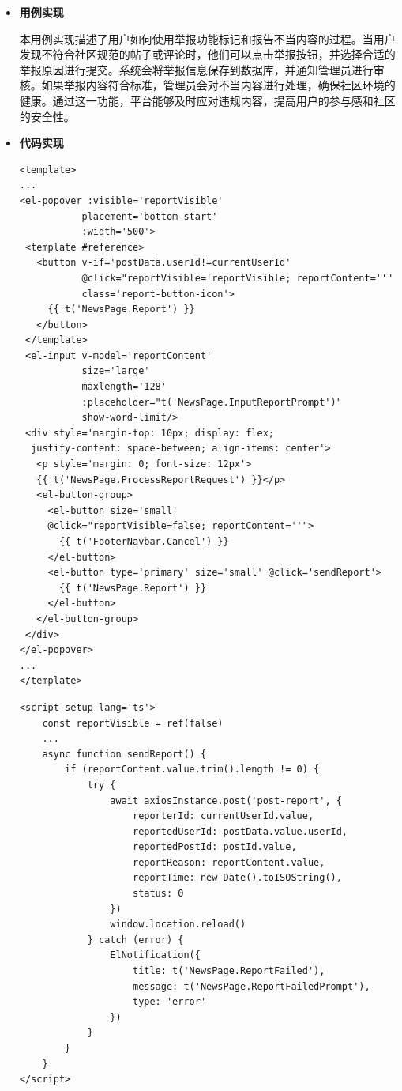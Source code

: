 \begin{itemize}
	\item \textbf{用例实现}
	
	本用例实现描述了用户如何使用举报功能标记和报告不当内容的过程。当用户发现不符合社区规范的帖子或评论时，他们可以点击举报按钮，并选择合适的举报原因进行提交。系统会将举报信息保存到数据库，并通知管理员进行审核。如果举报内容符合标准，管理员会对不当内容进行处理，确保社区环境的健康。通过这一功能，平台能够及时应对违规内容，提高用户的参与感和社区的安全性。
	
	\item \textbf{代码实现}
	\begin{verbatim}
<template>
...
<el-popover :visible='reportVisible'
           placement='bottom-start'
           :width='500'>
 <template #reference>
   <button v-if='postData.userId!=currentUserId'
           @click="reportVisible=!reportVisible; reportContent=''"
           class='report-button-icon'>
     {{ t('NewsPage.Report') }}
   </button>
 </template>
 <el-input v-model='reportContent'
           size='large'
           maxlength='128'
           :placeholder="t('NewsPage.InputReportPrompt')"
           show-word-limit/>
 <div style='margin-top: 10px; display: flex;
  justify-content: space-between; align-items: center'>
   <p style='margin: 0; font-size: 12px'>
   {{ t('NewsPage.ProcessReportRequest') }}</p>
   <el-button-group>
     <el-button size='small' 
     @click="reportVisible=false; reportContent=''">
       {{ t('FooterNavbar.Cancel') }}
     </el-button>
     <el-button type='primary' size='small' @click='sendReport'>
       {{ t('NewsPage.Report') }}
     </el-button>
   </el-button-group>
 </div>
</el-popover>
...
</template>
	\end{verbatim}
	
	\begin{verbatim}
<script setup lang='ts'>
	const reportVisible = ref(false)
	...
	async function sendReport() {
		if (reportContent.value.trim().length != 0) {
			try {
				await axiosInstance.post('post-report', {
					reporterId: currentUserId.value,
					reportedUserId: postData.value.userId,
					reportedPostId: postId.value,
					reportReason: reportContent.value,
					reportTime: new Date().toISOString(),
					status: 0
				})
				window.location.reload()
			} catch (error) {
				ElNotification({
					title: t('NewsPage.ReportFailed'),
					message: t('NewsPage.ReportFailedPrompt'),
					type: 'error'
				})
			}
		}
	}
</script>
	\end{verbatim}
\end{itemize}

